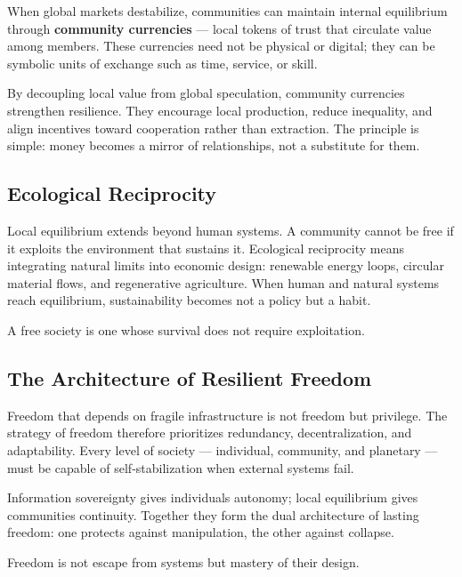 \documentclass[12pt,twoside]{book}
\begin{document}
When global markets destabilize, communities can maintain internal equilibrium through \textbf{community currencies} --- local tokens of trust that circulate value among members.  
These currencies need not be physical or digital; they can be symbolic units of exchange such as time, service, or skill.  

By decoupling local value from global speculation, community currencies strengthen resilience.  
They encourage local production, reduce inequality, and align incentives toward cooperation rather than extraction.  
The principle is simple: money becomes a mirror of relationships, not a substitute for them.

\subsection*{Ecological Reciprocity}

Local equilibrium extends beyond human systems.  
A community cannot be free if it exploits the environment that sustains it.  
Ecological reciprocity means integrating natural limits into economic design: renewable energy loops, circular material flows, and regenerative agriculture.  
When human and natural systems reach equilibrium, sustainability becomes not a policy but a habit.\\

\begin{keyidea}
A free society is one whose survival does not require exploitation.
\end{keyidea}

\subsection*{The Architecture of Resilient Freedom}

Freedom that depends on fragile infrastructure is not freedom but privilege.  
The strategy of freedom therefore prioritizes redundancy, decentralization, and adaptability.  
Every level of society --- individual, community, and planetary --- must be capable of self-stabilization when external systems fail.

Information sovereignty gives individuals autonomy; local equilibrium gives communities continuity.  
Together they form the dual architecture of lasting freedom: one protects against manipulation, the other against collapse.\\

\begin{keyidea}
Freedom is not escape from systems but mastery of their design.
\end{keyidea}
\end{document}

